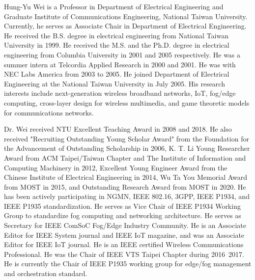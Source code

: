 \documentclass[10pt,journal, compsoc]{IEEEtran}
\begin{document}
\begin{IEEEbiography}{Hung-Yu Wei} is a Professor in Department of Electrical Engineering and Graduate Institute of Communications Engineering, National Taiwan University. Currently, he serves as Associate Chair in Department of Electrical Engineering. He received the B.S. degree in electrical engineering from National Taiwan University in 1999. He received the M.S. and the Ph.D. degree in electrical engineering from Columbia University in 2001 and 2005 respectively. He was a summer intern at Telcordia Applied Research in 2000 and 2001. He was with NEC Labs America from 2003 to 2005. He joined Department of Electrical Engineering at the National Taiwan University in July 2005. His research interests include next-generation wireless broadband networks, IoT, fog/edge computing, cross-layer design for wireless multimedia, and game theoretic models for communications networks.

Dr. Wei received NTU Excellent Teaching Award in 2008 and 2018. He also received "Recruiting Outstanding Young Scholar Award" from the Foundation for the Advancement of Outstanding Scholarship in 2006, K. T. Li Young Researcher Award from ACM Taipei/Taiwan Chapter and The Institute of Information and Computing Machinery in 2012, Excellent Young Engineer Award from the Chinese Institute of Electrical Engineering in 2014, Wu Ta You Memorial Award from MOST in 2015, and Outstanding Research Award from MOST in 2020. He has been actively participating in NGMN, IEEE 802.16, 3GPP, IEEE P1934, and IEEE P1935 standardization. He serves as Vice Chair of IEEE P1934 Working Group to standardize fog computing and networking architecture. He serves as Secretary for IEEE ComSoC Fog/Edge Industry Community. He is an Associate Editor for IEEE System journal and IEEE IoT magazine, and was an Associate Editor for IEEE IoT journal. He is an IEEE certified Wireless Communications Professional. He was the Chair of IEEE VTS Taipei Chapter during 2016~2017. He is currently the Chair of IEEE P1935 working group for edge/fog management and orchestration standard.

\end{IEEEbiography}


\clearpage
\appendices
\end{document}
